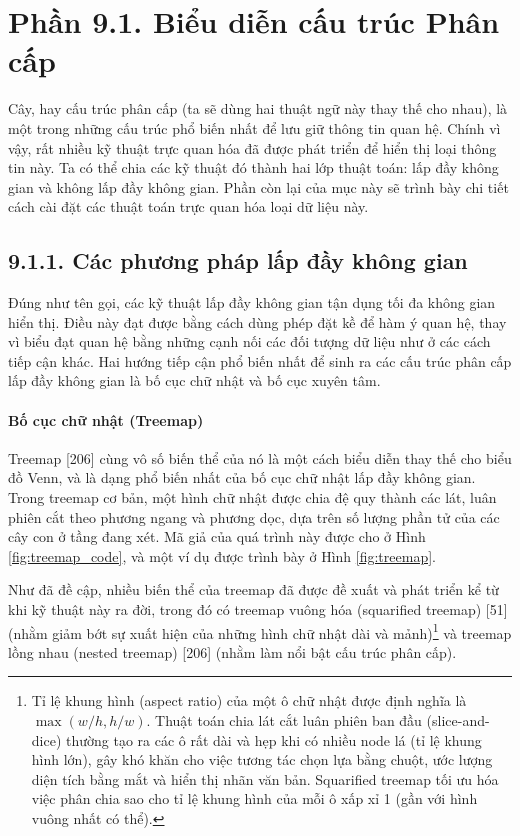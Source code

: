 \documentclass[12pt,a4paper,openany]{book}
\begin{document}
\chapter*{Phần 9.1. \newline Biểu diễn cấu trúc Phân cấp}

Cây, hay cấu trúc phân cấp (ta sẽ dùng hai thuật ngữ này thay thế cho nhau), là một trong những cấu trúc phổ biến nhất để lưu giữ thông tin quan hệ. Chính vì vậy, rất nhiều kỹ thuật trực quan hóa đã được phát triển để hiển thị loại thông tin này. Ta có thể chia các kỹ thuật đó thành hai lớp thuật toán: lấp đầy không gian và không lấp đầy không gian. Phần còn lại của mục này sẽ trình bày chi tiết cách cài đặt các thuật toán trực quan hóa loại dữ liệu này.

\section*{9.1.1. Các phương pháp lấp đầy không gian}

Đúng như tên gọi, các kỹ thuật lấp đầy không gian tận dụng tối đa không gian hiển thị. Điều này đạt được bằng cách dùng phép đặt kề để hàm ý quan hệ, thay vì biểu đạt quan hệ bằng những cạnh nối các đối tượng dữ liệu như ở các cách tiếp cận khác. Hai hướng tiếp cận phổ biến nhất để sinh ra các cấu trúc phân cấp lấp đầy không gian là bố cục chữ nhật và bố cục xuyên tâm.

\subsubsection{Bố cục chữ nhật (Treemap)}

Treemap [206] cùng vô số biến thể của nó là một cách biểu diễn thay thế cho biểu đồ Venn, và là dạng phổ biến nhất của bố cục chữ nhật lấp đầy không gian. Trong treemap cơ bản, một hình chữ nhật được chia đệ quy thành các lát, luân phiên cắt theo phương ngang và phương dọc, dựa trên số lượng phần tử của các cây con ở tầng đang xét. Mã giả của quá trình này được cho ở Hình \ref{fig:treemap_code}, và một ví dụ được trình bày ở Hình \ref{fig:treemap}.

Như đã đề cập, nhiều biến thể của treemap đã được đề xuất và phát triển kể từ khi kỹ thuật này ra đời, trong đó có treemap vuông hóa (squarified treemap) [51] (nhằm giảm bớt sự xuất hiện của những hình chữ nhật dài và mảnh)\footnote{Tỉ lệ khung hình (aspect ratio) của một ô chữ nhật được định nghĩa là $\max(w/h, h/w)$. Thuật toán chia lát cắt luân phiên ban đầu (slice-and-dice) thường tạo ra các ô rất dài và hẹp khi có nhiều node lá (tỉ lệ khung hình lớn), gây khó khăn cho việc tương tác chọn lựa bằng chuột, ước lượng diện tích bằng mắt và hiển thị nhãn văn bản. Squarified treemap tối ưu hóa việc phân chia sao cho tỉ lệ khung hình của mỗi ô xấp xỉ 1 (gần với hình vuông nhất có thể).} và treemap lồng nhau (nested treemap) [206] (nhằm làm nổi bật cấu trúc phân cấp).
\end{document}
